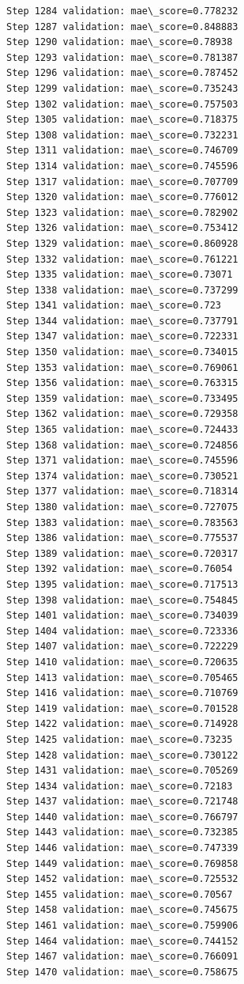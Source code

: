 \documentclass[11pt]{article}
\begin{document}
\begin{Verbatim}[commandchars=\\\{\}]
Step 1284 validation: mae\_score=0.778232
Step 1287 validation: mae\_score=0.848883
Step 1290 validation: mae\_score=0.78938
Step 1293 validation: mae\_score=0.781387
Step 1296 validation: mae\_score=0.787452
Step 1299 validation: mae\_score=0.735243
Step 1302 validation: mae\_score=0.757503
Step 1305 validation: mae\_score=0.718375
Step 1308 validation: mae\_score=0.732231
Step 1311 validation: mae\_score=0.746709
Step 1314 validation: mae\_score=0.745596
Step 1317 validation: mae\_score=0.707709
Step 1320 validation: mae\_score=0.776012
Step 1323 validation: mae\_score=0.782902
Step 1326 validation: mae\_score=0.753412
Step 1329 validation: mae\_score=0.860928
Step 1332 validation: mae\_score=0.761221
Step 1335 validation: mae\_score=0.73071
Step 1338 validation: mae\_score=0.737299
Step 1341 validation: mae\_score=0.723
Step 1344 validation: mae\_score=0.737791
Step 1347 validation: mae\_score=0.722331
Step 1350 validation: mae\_score=0.734015
Step 1353 validation: mae\_score=0.769061
Step 1356 validation: mae\_score=0.763315
Step 1359 validation: mae\_score=0.733495
Step 1362 validation: mae\_score=0.729358
Step 1365 validation: mae\_score=0.724433
Step 1368 validation: mae\_score=0.724856
Step 1371 validation: mae\_score=0.745596
Step 1374 validation: mae\_score=0.730521
Step 1377 validation: mae\_score=0.718314
Step 1380 validation: mae\_score=0.727075
Step 1383 validation: mae\_score=0.783563
Step 1386 validation: mae\_score=0.775537
Step 1389 validation: mae\_score=0.720317
Step 1392 validation: mae\_score=0.76054
Step 1395 validation: mae\_score=0.717513
Step 1398 validation: mae\_score=0.754845
Step 1401 validation: mae\_score=0.734039
Step 1404 validation: mae\_score=0.723336
Step 1407 validation: mae\_score=0.722229
Step 1410 validation: mae\_score=0.720635
Step 1413 validation: mae\_score=0.705465
Step 1416 validation: mae\_score=0.710769
Step 1419 validation: mae\_score=0.701528
Step 1422 validation: mae\_score=0.714928
Step 1425 validation: mae\_score=0.73235
Step 1428 validation: mae\_score=0.730122
Step 1431 validation: mae\_score=0.705269
Step 1434 validation: mae\_score=0.72183
Step 1437 validation: mae\_score=0.721748
Step 1440 validation: mae\_score=0.766797
Step 1443 validation: mae\_score=0.732385
Step 1446 validation: mae\_score=0.747339
Step 1449 validation: mae\_score=0.769858
Step 1452 validation: mae\_score=0.725532
Step 1455 validation: mae\_score=0.70567
Step 1458 validation: mae\_score=0.745675
Step 1461 validation: mae\_score=0.759906
Step 1464 validation: mae\_score=0.744152
Step 1467 validation: mae\_score=0.766091
Step 1470 validation: mae\_score=0.758675

\end{Verbatim}
\end{document}
